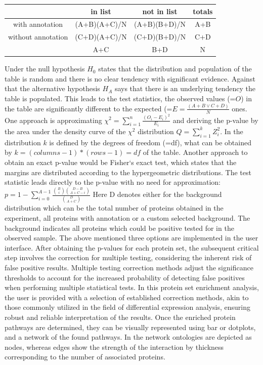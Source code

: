 \documentclass[
  11pt,
]{article}
\begin{document}
\begin{center}
\begin{tabular}{|c|| c| c|| c|} 
 \hline
   & in list & not in list & totals \\ [0.5ex] 
 \hline\hline
 with annotation & (A+B)(A+C)/N  & (A+B)(B+D)/N & A+B \\ 
 \hline
 without annotation & (C+D)(A+C)/N & (C+D)(B+D)/N & C+D \\
 \hline
  & A+C & B+D & N \\
 \hline
\end{tabular}
\end{center}

Under the null hypothesis \(H_{0}\) states that the distribution and
population of the table is random and there is no clear tendency with
significant evidence. Against that the alternative hypothesis \(H_{A}\)
says that there is an underlying tendency the table is populated. This
leads to the test statistics, the observed values (=\(O\)) in the table
are significantly different to the expected
(=\(E=\frac{(A+B \lor C+D)}{N}\) ones. One approach is approximating
\(\chi^2= \sum_{i=1}^{n} \frac{(O_i - E_i)^2}{E_i}\) and deriving the
p-value by the area under the density curve of the \(\chi^2\)
distribution \(Q = \sum_{i=1}^{k} Z_{i}^{2}\). In the distribution \(k\)
is defined by the degrees of freedom (=df), what can be obtained by
\(k=(columns-1)*(rows-1)=df\) of the table. Another approach to obtain
an exact p-value would be Fisher`s exact test, which states that the
margins are distributed according to the hypergeometric distributions.
The test statistic leads directly to the p-value with no need for
approximation:
\(p=1-\sum_{i=0}^{A-1}\frac{\binom{B}{i}\binom{D-B}{A+C-i}}{\binom{D}{A+C}}\)
Here D denotes either for the background distribution which can be the
total number of proteins obtained in the experiment, all proteins with
annotation or a custom selected background. The background indicates all
proteins which could be positive tested for in the observed sample. The
above mentioned three options are implemented in the user interface.
After obtaining the p-values for each protein set, the subsequent
critical step involves the correction for multiple testing, considering
the inherent risk of false positive results. Multiple testing correction
methods adjust the significance thresholds to account for the increased
probability of detecting false positives when performing multiple
statistical tests. In this protein set enrichment analysis, the user is
provided with a selection of established correction methods, akin to
those commonly utilized in the field of differential expression
analysis, ensuring robust and reliable interpretation of the results.
Once the enriched protein pathways are determined, they can be visually
represented using bar or dotplots, and a network of the found pathways.
In the network ontologies are depicted as nodes, whereas edges show the
strength of the interaction by thickness corresponding to the number of
associated proteins.
\end{document}
